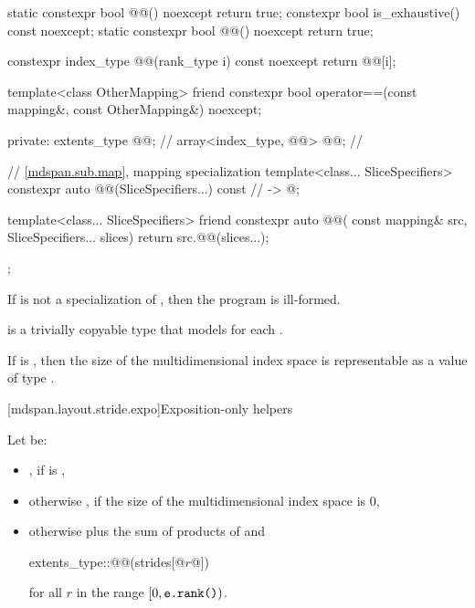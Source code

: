 \begin{codeblock}
{{    static constexpr bool @@() noexcept { return true; }
    constexpr bool is_exhaustive() const noexcept;
    static constexpr bool @@() noexcept { return true; }

    constexpr index_type @@(rank_type i) const noexcept { return @@[i]; }

    template<class OtherMapping>
      friend constexpr bool operator==(const mapping&, const OtherMapping&) noexcept;

  private:
    extents_type @@{};                    // \expos
    array<index_type, @@> @@{};        // \expos

    // \ref{mdspan.sub.map},  mapping specialization
    template<class... SliceSpecifiers>
      constexpr auto @@(SliceSpecifiers...) const       // \expos
        -> @\seebelow@;

    template<class... SliceSpecifiers>
      friend constexpr auto @@(
        const mapping& src, SliceSpecifiers... slices) {
          return src.@@(slices...);
      }
  };
}
\end{codeblock}

\pnum
If  is not a specialization of ,
then the program is ill-formed.

\pnum
{} is a trivially copyable type
that models  for each .

\pnum
\mandates
If  is ,
then the size of the multidimensional index space 
is representable as a value of type .

[mdspan.layout.stride.expo]{Exposition-only helpers}

\pnum
Let  be:
\begin{itemize}
\item
{}, if  is ,
\item
otherwise , if the size of the multidimensional index space  is 0,
\item
otherwise  plus the sum of products of
 and
\begin{codeblock}
extents_type::@@(strides[@$r$@])
\end{codeblock}
  for all $r$ in the range $[0, \tcode{e.rank()})$.
\end{itemize}


